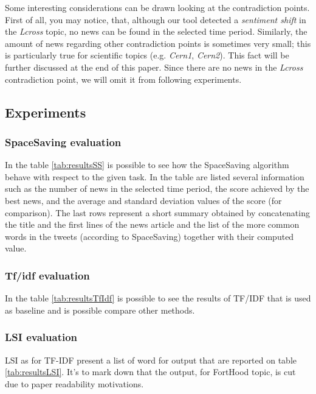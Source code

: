 Some interesting considerations can be drawn looking at the contradiction points.
First of all, you may notice, that, although our tool detected a \emph{sentiment
shift} in the \emph{Lcross} topic, no news can be found in the selected time period.
Similarly, the amount of news regarding other contradiction points is sometimes
very small; this is particularly true for scientific topics (e.g. \emph{Cern1},
\emph{Cern2}).
This fact will be further discussed at the end of this paper. Since there are no
news in the \emph{Lcross} contradiction point, we will omit it from following
experiments.

\subsection*{Experiments}
\subsubsection*{SpaceSaving evaluation}
In the table \ref{tab:resultsSS} is possible to see how the SpaceSaving algorithm behave with respect to the given task.
In the table are listed several information such as the number of news in the selected time period, the score achieved by the best news, and the average and standard deviation values of the score (for comparison). The last rows represent a short summary obtained by concatenating the title and the first lines of the news article and the list of the more common words in the tweets (according to SpaceSaving) together with their computed value.

\subsubsection*{Tf/idf evaluation}
In the table \ref{tab:resultsTfIdf} is possible to see the results of TF/IDF that is used as baseline and is possible compare other methods.

\subsubsection*{LSI evaluation}
LSI as for TF-IDF present a list of word for output that are reported on table \ref{tab:resultsLSI}. It's to mark down that the output, for FortHood topic, is cut due to paper readability motivations.



